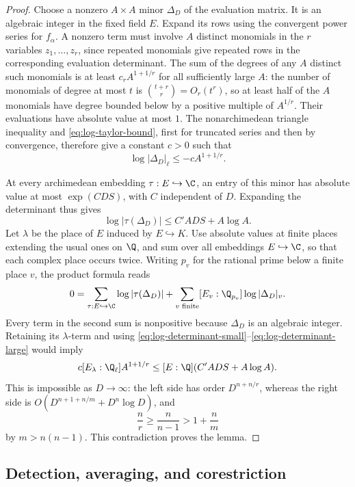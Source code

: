 \begin{proof}
Choose a nonzero $A\times A$ minor $\Delta_D$ of the evaluation
matrix.  It is an algebraic integer in the fixed field $E$.
Expand its rows using the convergent power series for $f_\alpha$.
A nonzero term must involve $A$ distinct monomials in the $r$
variables $z_1,\ldots,z_r$, since repeated monomials give repeated
rows in the corresponding evaluation determinant.  The sum of the
degrees of any $A$ distinct such monomials is at least
$c_rA^{1+1/r}$ for all sufficiently large $A$: the number of
monomials of degree at most $t$ is $\binom{t+r}{r}=O_r(t^r)$,
so at least half of the $A$ monomials have degree bounded below by
a positive multiple of $A^{1/r}$.  Their evaluations have absolute
value at most $1$.  The nonarchimedean triangle inequality and
\eqref{eq:log-taylor-bound}, first for truncated series and then by
convergence, therefore give a constant $c>0$ such that
\begin{equation}\label{eq:log-determinant-small}
 \log|\Delta_D|_\ell\leq-cA^{1+1/r}.
\end{equation}

At every archimedean embedding $\tau:E\hookrightarrow\C$, an
entry of this minor has absolute value at most $\exp(CDS)$, with
$C$ independent of $D$.  Expanding the determinant thus gives
\begin{equation}\label{eq:log-determinant-large}
 \log|\tau(\Delta_D)|\leq C'ADS+A\log A.
\end{equation}
Let $\lambda$ be the place of $E$ induced by $E\hookrightarrow K$.
Use absolute values at finite places extending the usual ones on
$\Q$, and sum over all embeddings $E\hookrightarrow\C$, so that
each complex place occurs twice.  Writing $p_v$ for the rational
prime below a finite place $v$, the product formula reads
\[
 0=\sum_{\tau:E\hookrightarrow\C}\log|\tau(\Delta_D)|
     +\sum_{v\text{ finite}}[E_v:\Q_{p_v}]
                            \log|\Delta_D|_v.
\]
Every term in the second sum is nonpositive because $\Delta_D$ is
an algebraic integer.  Retaining its $\lambda$-term and using
\eqref{eq:log-determinant-small}--\eqref{eq:log-determinant-large}
would imply
\[
 c[E_\lambda:\Q_\ell]A^{1+1/r}
 \leq [E:\Q](C'ADS+A\log A).
\]
This is impossible as $D\to\infty$: the left side has order
$D^{n+n/r}$, whereas the right side is
$O(D^{n+1+n/m}+D^n\log D)$, and
\[
 \frac nr\geq\frac n{n-1}>1+\frac nm
\]
by $m>n(n-1)$.  This contradiction proves the lemma.
\end{proof}

\subsection{Detection, averaging, and corestriction}


